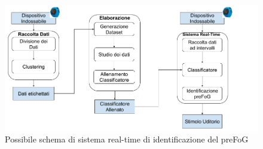 \begin{figure}[]
	\centering
	\includegraphics[scale=0.4]{images/LavoroFuturo.png}
	\caption{Possibile schema di sistema real-time di identificazione del preFoG}
	\label{LavoroFuturo}
\end{figure}